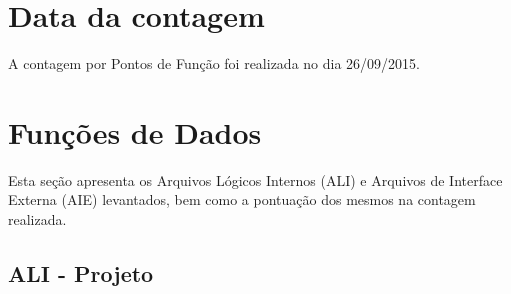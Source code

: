 \section{Data da contagem}

  A contagem por Pontos de Função foi realizada no dia 26/09/2015.

\section{Funções de Dados}

Esta seção apresenta os Arquivos Lógicos Internos (ALI) e Arquivos de Interface Externa (AIE) levantados, bem como a 
pontuação dos mesmos na contagem realizada.

  \subsection{ALI - Projeto}
  
